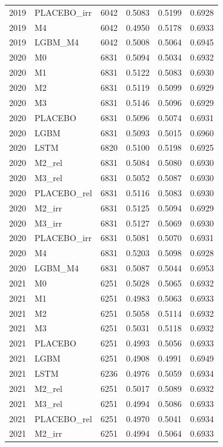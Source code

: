 \begin{tabular}{llrrrr}
2019 & PLACEBO\_irr & 6042 & 0.5083 & 0.5199 & 0.6928 \\
2019 & M4 & 6042 & 0.4950 & 0.5178 & 0.6933 \\
2019 & LGBM\_M4 & 6042 & 0.5008 & 0.5064 & 0.6945 \\
2020 & M0 & 6831 & 0.5094 & 0.5034 & 0.6932 \\
2020 & M1 & 6831 & 0.5122 & 0.5083 & 0.6930 \\
2020 & M2 & 6831 & 0.5119 & 0.5099 & 0.6929 \\
2020 & M3 & 6831 & 0.5146 & 0.5096 & 0.6929 \\
2020 & PLACEBO & 6831 & 0.5096 & 0.5074 & 0.6931 \\
2020 & LGBM & 6831 & 0.5093 & 0.5015 & 0.6960 \\
2020 & LSTM & 6820 & 0.5100 & 0.5198 & 0.6925 \\
2020 & M2\_rel & 6831 & 0.5084 & 0.5080 & 0.6930 \\
2020 & M3\_rel & 6831 & 0.5052 & 0.5087 & 0.6930 \\
2020 & PLACEBO\_rel & 6831 & 0.5116 & 0.5083 & 0.6930 \\
2020 & M2\_irr & 6831 & 0.5125 & 0.5094 & 0.6929 \\
2020 & M3\_irr & 6831 & 0.5127 & 0.5069 & 0.6930 \\
2020 & PLACEBO\_irr & 6831 & 0.5081 & 0.5070 & 0.6931 \\
2020 & M4 & 6831 & 0.5203 & 0.5098 & 0.6928 \\
2020 & LGBM\_M4 & 6831 & 0.5087 & 0.5044 & 0.6953 \\
2021 & M0 & 6251 & 0.5028 & 0.5065 & 0.6932 \\
2021 & M1 & 6251 & 0.4983 & 0.5063 & 0.6933 \\
2021 & M2 & 6251 & 0.5058 & 0.5114 & 0.6932 \\
2021 & M3 & 6251 & 0.5031 & 0.5118 & 0.6932 \\
2021 & PLACEBO & 6251 & 0.4993 & 0.5056 & 0.6933 \\
2021 & LGBM & 6251 & 0.4908 & 0.4991 & 0.6949 \\
2021 & LSTM & 6236 & 0.4976 & 0.5059 & 0.6934 \\
2021 & M2\_rel & 6251 & 0.5017 & 0.5089 & 0.6932 \\
2021 & M3\_rel & 6251 & 0.4994 & 0.5086 & 0.6933 \\
2021 & PLACEBO\_rel & 6251 & 0.4970 & 0.5041 & 0.6934 \\
2021 & M2\_irr & 6251 & 0.4994 & 0.5064 & 0.6933 \\

\end{tabular}
